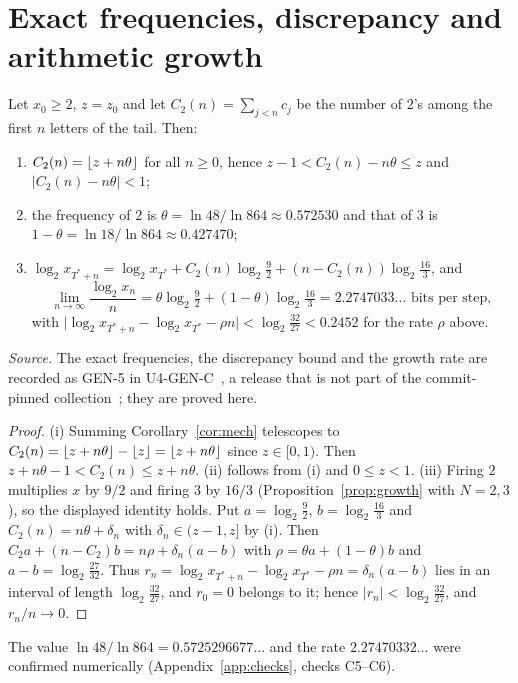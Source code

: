 \section{Exact frequencies, discrepancy and arithmetic growth}\label{sec:freq}
\begin{theorem}\label{thm:C}
Let $x_0\ge2$, $z=z_0$ and let $C_2(n)=\sum_{j<n}c_j$ be the number of $2$'s among the first $n$ letters of the tail. Then:
\begin{enumerate}[label=(\roman*),itemsep=1pt]
\item $C_2(n)=\lfloor z+n\theta\rfloor$ for all $n\ge0$, hence $z-1<C_2(n)-n\theta\le z$ and $|C_2(n)-n\theta|<1$;
\item the frequency of $2$ is $\theta=\ln48/\ln864\approx0.572530$ and that of $3$ is $1-\theta=\ln18/\ln864\approx0.427470$;
\item $\log_2x_{T^*+n}=\log_2x_{T^*}+C_2(n)\log_2\tfrac92+(n-C_2(n))\log_2\tfrac{16}{3}$, and
\[
\lim_{n\to\infty}\frac{\log_2x_n}{n}=\theta\log_2\tfrac92+(1-\theta)\log_2\tfrac{16}3=2.2747033\ldots\text{ bits per step},
\]
with $\bigl|\log_2x_{T^*+n}-\log_2x_{T^*}-\rho n\bigr|<\log_2\tfrac{32}{27}<0.2452$ for the rate $\rho$ above.
\end{enumerate}
\end{theorem}
\noindent\emph{Source.} The exact frequencies, the discrepancy bound and the growth rate are recorded as GEN-5 in U4-GEN-C~\cite{u4genc}, a release that is not part of the commit-pinned collection~\cite{coll}; they are proved here.
\begin{proof}
(i) Summing Corollary~\ref{cor:mech} telescopes to $C_2(n)=\lfloor z+n\theta\rfloor-\lfloor z\rfloor=\lfloor z+n\theta\rfloor$ since $z\in[0,1)$. Then $z+n\theta-1<C_2(n)\le z+n\theta$. (ii) follows from (i) and $0\le z<1$. (iii) Firing $2$ multiplies $x$ by $9/2$ and firing $3$ by $16/3$ (Proposition~\ref{prop:growth} with $N=2,3$), so the displayed identity holds. Put $a=\log_2\frac92$, $b=\log_2\frac{16}3$ and $C_2(n)=n\theta+\delta_n$ with $\delta_n\in(z-1,z]$ by (i). Then $C_2a+(n-C_2)b=n\rho+\delta_n(a-b)$ with $\rho=\theta a+(1-\theta)b$ and $a-b=\log_2\frac{27}{32}$. Thus $r_n=\log_2x_{T^*+n}-\log_2x_{T^*}-\rho n=\delta_n(a-b)$ lies in an interval of length $\log_2\frac{32}{27}$, and $r_0=0$ belongs to it; hence $|r_n|<\log_2\frac{32}{27}$, and $r_n/n\to0$. \end{proof}
The value $\ln48/\ln864=0.5725296677\ldots$ and the rate $2.27470332\ldots$ were confirmed numerically (Appendix~\ref{app:checks}, checks C5--C6).

